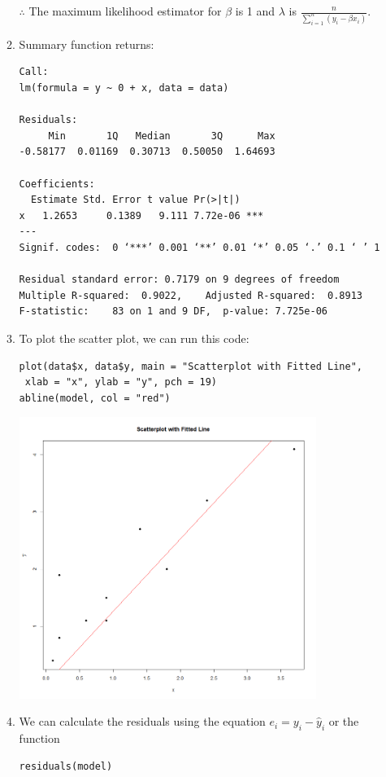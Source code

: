 \documentclass[12pt]{article}
\begin{document}
\begin{enumerate}[1.]
\begin{enumerate}
                $\therefore$ The maximum likelihood estimator for $\beta$ is 1 and $\lambda$ is $\frac{n}{\sum_{i=1}^{n} (y_i - \beta x_i)}$.
                
            \item 
            
            Summary function returns:
            \begin{verbatim}
Call:
lm(formula = y ~ 0 + x, data = data)

Residuals:
     Min       1Q   Median       3Q      Max 
-0.58177  0.01169  0.30713  0.50050  1.64693 

Coefficients:
  Estimate Std. Error t value Pr(>|t|)    
x   1.2653     0.1389   9.111 7.72e-06 ***
---
Signif. codes:  0 ‘***’ 0.001 ‘**’ 0.01 ‘*’ 0.05 ‘.’ 0.1 ‘ ’ 1

Residual standard error: 0.7179 on 9 degrees of freedom
Multiple R-squared:  0.9022,	Adjusted R-squared:  0.8913 
F-statistic:    83 on 1 and 9 DF,  p-value: 7.725e-06
            \end{verbatim}
            \item To plot the scatter plot, we can run this code:
            \begin{verbatim}
plot(data$x, data$y, main = "Scatterplot with Fitted Line",
 xlab = "x", ylab = "y", pch = 19)
abline(model, col = "red")
            \end{verbatim}
            
            \includegraphics[width=0.80\textwidth]{Rplot.png}

            \item We can calculate the residuals using the equation $e_i = y_i - \hat{y}_i $ or the function 
            \begin{verbatim}
residuals(model)
            \end{verbatim}


\end{enumerate}
\end{enumerate}
\end{document}
